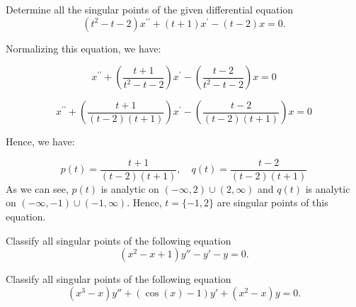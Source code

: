 \documentclass[11pt]{article}
\begin{document}
\begin{problem}
{ Determine all the singular points of the given differential equation}
\begin{equation*}
(t^2-t-2)x^{\prime \prime} + (t+1)x^{\prime} - (t-2)x =0.
\end{equation*}
\end{problem}
\begin{solution}
Normalizing this equation, we have:

\begin{equation*}
x^{\prime \prime} + \left(\dfrac{t+1}{t^2-t-2}\right)x^{\prime} - \left(\dfrac{t-2}{t^2-t-2}\right)x =0
\end{equation*}

\begin{equation*}
x^{\prime \prime} + \left(\dfrac{t+1}{(t-2)(t+1)}\right)x^{\prime} - \left(\dfrac{t-2}{(t-2)(t+1)}\right)x =0
\end{equation*}

Hence, we have:

\begin{equation*}
p(t) = \dfrac{t+1}{(t-2)(t+1)}, \quad q(t)  = \dfrac{t-2}{(t-2)(t+1)}
\end{equation*}
As we can see,  $p(t)$ is analytic on $(-\infty, 2) \cup (2, \infty)$ and $q(t)$ is analytic on  $(-\infty, -1) \cup (-1, \infty)$. 
Hence, $ t = \{-1,2\}$ are singular points of this equation.
\end{solution}

\begin{problem}
Classify all singular points of the following equation
\begin{equation*}
(x^{2}-x+1)y'' -y' - y = 0.
\end{equation*}
\end{problem}



\begin{problem}
Classify all singular points of the following equation
\begin{equation*}
(x^{3}-x)y'' + (\cos (x) - 1)y' + (x^2 -x) y = 0.
\end{equation*}
\end{problem}
\end{document}
